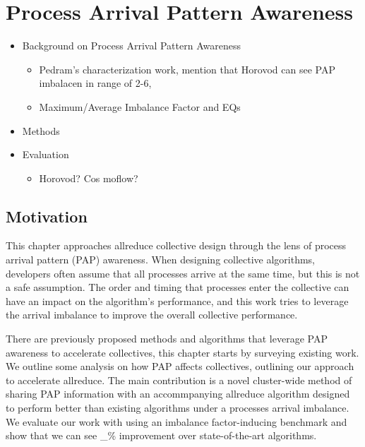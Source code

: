 
\glsresetall %
\chapter[PAPAwareness]{Process Arrival Pattern Awareness}\label{ch:PAPAwareness}

\begin{itemize}
    \item Background on Process Arrival Pattern Awareness
    \begin{itemize}
        \item Pedram's characterization work, mention that Horovod can see PAP imbalacen in range of 2-6, \cite{Alizadeh2022PAPCollDL, Mohammadalizadehbakhtevari2021Thesis}
        \item Maximum/Average Imbalance Factor and EQs
    \end{itemize}
    \item Methods
    \item Evaluation
    \begin{itemize}
        \item Horovod? Cos  moflow?
    \end{itemize}
\end{itemize}

\section{Motivation}

This chapter approaches allreduce collective design through the lens of process arrival pattern (PAP) awareness. 
When designing collective algorithms, developers often assume that all processes arrive at the same time, but this is not a safe assumption.
The order and timing that processes enter the collective can have an impact on the algorithm's performance, and this work tries to leverage the arrival imbalance to improve the overall collective performance.

There are previously proposed methods and algorithms that leverage PAP awareness to accelerate collectives, this chapter starts by surveying existing work.
We outline some analysis on how PAP affects collectives, outlining our approach to accelerate allreduce.
The main contribution is a novel cluster-wide method of sharing PAP information with an accommpanying allreduce algorithm designed to perform better than existing algorithms under a processes arrival imbalance.
We evaluate our work with using an imbalance factor-inducing benchmark and show that we can see \_\% improvement over state-of-the-art algorithms.  


